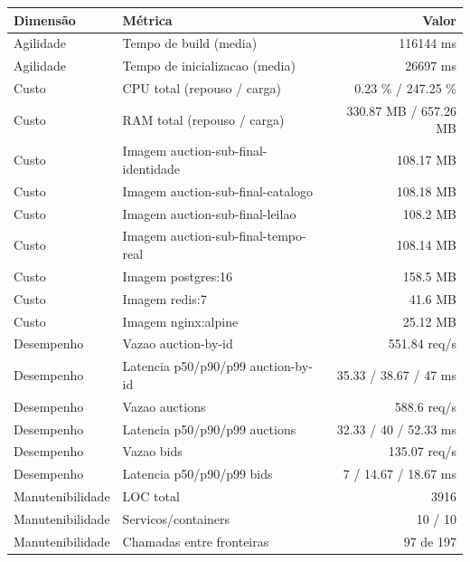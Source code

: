 \begin{quadro}[htb]
  \centering
  \caption{Métricas (auction, subdominio, snapshot-final).}
  \label{qua:metricas-auction-subdominio-snapshot-final}
  \renewcommand{\arraystretch}{1.15}
  \begin{tabular}{|l|l|r|}
    \hline
    \textbf{Dimensão} & \textbf{Métrica} & \textbf{Valor} \\
    \hline
    Agilidade & Tempo de build (media) & 116144 ms \\ \hline
    Agilidade & Tempo de inicializacao (media) & 26697 ms \\ \hline
    Custo & CPU total (repouso / carga) & 0.23 \% / 247.25 \% \\ \hline
    Custo & RAM total (repouso / carga) & 330.87 MB / 657.26 MB \\ \hline
    Custo & Imagem auction-sub-final-identidade & 108.17 MB \\ \hline
    Custo & Imagem auction-sub-final-catalogo & 108.18 MB \\ \hline
    Custo & Imagem auction-sub-final-leilao & 108.2 MB \\ \hline
    Custo & Imagem auction-sub-final-tempo-real & 108.14 MB \\ \hline
    Custo & Imagem postgres:16 & 158.5 MB \\ \hline
    Custo & Imagem redis:7 & 41.6 MB \\ \hline
    Custo & Imagem nginx:alpine & 25.12 MB \\ \hline
    Desempenho & Vazao auction-by-id & 551.84 req/s \\ \hline
    Desempenho & Latencia p50/p90/p99 auction-by-id & 35.33 / 38.67 / 47 ms \\ \hline
    Desempenho & Vazao auctions & 588.6 req/s \\ \hline
    Desempenho & Latencia p50/p90/p99 auctions & 32.33 / 40 / 52.33 ms \\ \hline
    Desempenho & Vazao bids & 135.07 req/s \\ \hline
    Desempenho & Latencia p50/p90/p99 bids & 7 / 14.67 / 18.67 ms \\ \hline
    Manutenibilidade & LOC total & 3916 \\ \hline
    Manutenibilidade & Servicos/containers & 10 / 10 \\ \hline
    Manutenibilidade & Chamadas entre fronteiras & 97 de 197 \\ \hline
  \end{tabular}
\end{quadro}
